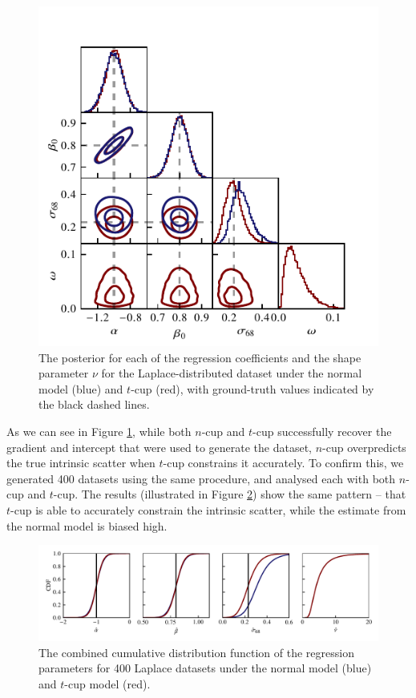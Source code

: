 \documentclass[fleqn,usenatbib]{rasti}
\begin{document}
\begin{figure}
    \includegraphics[width=\columnwidth]{graphics/fixed/corner_laplace.pdf}
    \caption{The posterior for each of the regression coefficients and the shape
    parameter $\nu$ for the Laplace-distributed dataset under the normal model
    (blue) and $t$-cup (red), with ground-truth values indicated by the black
    dashed lines.}
    \label{fig:results.laplace.corner}
\end{figure}

As we can see in Figure \ref{fig:results.laplace.corner}, while both $n$-cup and
$t$-cup successfully recover the gradient and intercept that were used to
generate the dataset, $n$-cup overpredicts the true intrinsic scatter when
$t$-cup constrains it accurately. To confirm this, we generated 400 datasets
using the same procedure, and analysed each with both $n$-cup and $t$-cup. The
results (illustrated in Figure \ref{fig:results.laplace.map}) show the same
pattern -- that $t$-cup is able to accurately constrain the intrinsic scatter,
while the estimate from the normal model is biased high.

\begin{figure}
    \includegraphics[width=\textwidth, trim={0 0.3cm 0 0}, clip]{graphics/fixed/laplace_cdf.pdf}
    \caption{The combined cumulative distribution function of the regression
    parameters for 400 Laplace datasets under the normal model
    (blue) and $t$-cup model (red).}
    \label{fig:results.laplace.map}
\end{figure}
\end{document}
